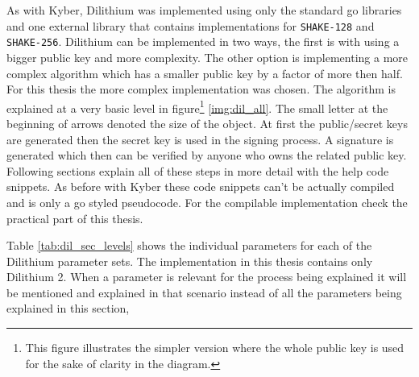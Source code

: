 As with Kyber, Dilithium was implemented using only the standard go libraries and one external library \cite{00fV2cvg7Z6H2tS3} that contains implementations for \texttt{SHAKE-128} and \texttt{SHAKE-256}. Dilithium can be implemented in two ways, the first is with using a bigger public key and more complexity. The other option is implementing a more complex algorithm which has a smaller public key by a factor of more then half. For this thesis the more complex implementation was chosen. The algorithm is explained at a very basic level in figure\footnote{This figure illustrates the simpler version where the whole public key is used for the sake of clarity in the diagram.} \ref{img:dil_all}. The small letter at the beginning of arrows denoted the size of the object. At first the public/secret keys are generated then the secret key is used in the signing process. A signature is generated which then can be verified by anyone who owns the related public key. Following sections explain all of these steps in more detail with the help code snippets. As before with Kyber these code snippets can't be actually compiled and is only a go styled pseudocode. For the compilable implementation check the practical part of this thesis.

Table \ref{tab:dil_sec_levels} shows the individual parameters for each of the Dilithium parameter sets. The implementation in this thesis contains only Dilithium 2. When a parameter is relevant for the process being explained it will be mentioned and explained in that scenario instead of all the parameters being explained in this section,

